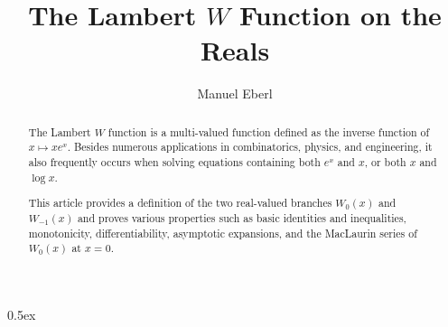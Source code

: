 \documentclass[11pt,a4paper]{article}
\begin{document}
\title{The Lambert $W$ Function on the Reals}
\author{Manuel Eberl}
\maketitle

\begin{abstract}
The Lambert $W$ function is a multi-valued function defined as the inverse function of $x \mapsto x e^x$. Besides numerous applications in combinatorics, physics, and engineering, it also frequently occurs when solving equations containing both $e^x$ and $x$, or both $x$ and $\log x$.

This article provides a definition of the two real-valued branches $W_0(x)$ and $W_{-1}(x)$ and proves various properties such as basic identities and inequalities, monotonicity, differentiability, asymptotic expansions, and the MacLaurin series of $W_0(x)$ at $x = 0$.
\end{abstract}

\tableofcontents
\newpage
\parindent 0pt\parskip 0.5ex



\nocite{corless96}


\end{document}
